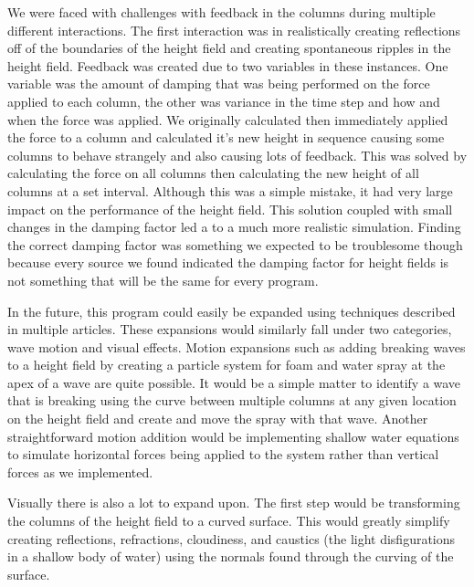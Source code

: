 \documentclass[12pt,notitlepage]{article}
\begin{document}
We were faced with challenges with feedback in the columns during multiple 
different interactions. The first interaction was in realistically creating 
reflections off of the boundaries of the height field and creating spontaneous 
ripples in the height field. Feedback was created due to two variables in these 
instances. One variable was the amount of damping that was being performed on 
the force applied to each column, the other was variance in the time step and 
how and when the force was applied. We originally calculated then immediately 
applied the force to a column and calculated it's new height in sequence 
causing some columns to behave strangely and also causing lots of feedback. 
This was solved by calculating the force on all columns then calculating the 
new height of all columns at a set interval. Although this was a simple 
mistake, it had very large impact on the performance of the height field. This 
solution coupled with small changes in the damping factor led a to a much more 
realistic simulation. Finding the correct damping factor was something we 
expected to be troublesome though because every source we found indicated the 
damping factor for height fields is not something that will be the same for 
every program.

In the future, this program could easily be expanded using techniques described 
in multiple articles. These expansions would similarly fall under two 
categories, wave motion and visual effects. Motion expansions such as adding 
breaking waves to a height field by creating a particle system for foam and 
water spray at the apex of a wave are quite possible. It would be a simple 
matter to identify a wave that is breaking using the curve between multiple 
columns at any given location on the height field and create and move the spray 
with that wave. Another straightforward motion addition would be implementing 
shallow water equations to simulate horizontal forces being applied to the 
system rather than vertical forces as we implemented.

Visually there is also a lot to expand upon. The first step would be 
transforming the columns of the height field to a curved surface. This would 
greatly simplify creating reflections, refractions, cloudiness, and caustics 
(the light disfigurations in a shallow body of water) using the normals found 
through the curving of the surface.

\nocite{*}
\printbibliography
\end{document}
